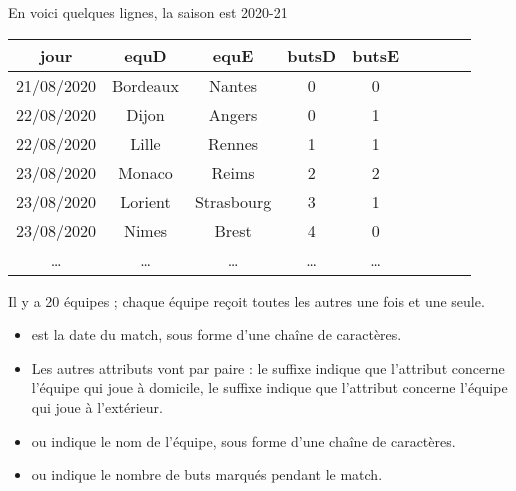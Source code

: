 En voici quelques lignes, la saison est 2020-21
\begin{center}
\begin{tabular}{|c|c|c|c|c|c|c|c|c|}
\hline
jour        &equD       &equE       &butsD  &butsE \\
\hline
21/08/2020	&Bordeaux	&Nantes	    &0	    &0\\
22/08/2020	&Dijon	    &Angers	    &0	    &1\\
22/08/2020	&Lille	    &Rennes	    &1	    &1\\
23/08/2020	&Monaco	    &Reims	    &2	    &2\\
23/08/2020	&Lorient	&Strasbourg	&3	    &1\\
23/08/2020	&Nimes	    &Brest	    &4	    &0\\
\dots       &\dots      &\dots      &\dots  &\dots \\   
\end{tabular}
\end{center}
Il y a 20 équipes ; chaque équipe reçoit toutes les autres une fois et une seule.

\begin{itemize}
\item {} est la date du match, sous forme d'une chaîne de caractères.
\item Les autres attributs vont par paire : le suffixe  indique que l'attribut concerne l'équipe qui joue à domicile, le suffixe  indique que l'attribut concerne l'équipe qui joue à l'extérieur.
\item {} ou  indique le nom de l'équipe, sous forme d'une chaîne de caractères.
\item {} ou  indique le nombre de buts marqués pendant le match.
\end{itemize}

